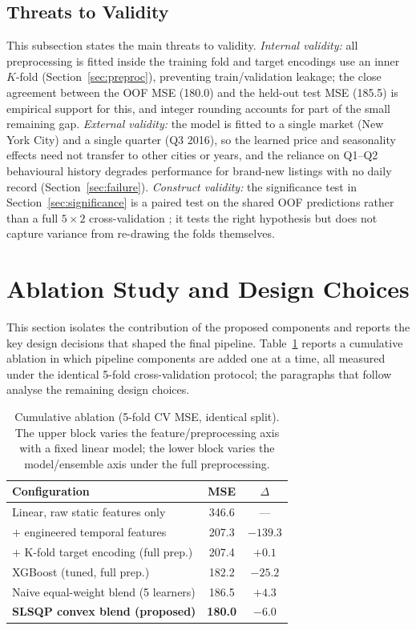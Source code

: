 \documentclass[journal]{IEEEtran}
\begin{document}
\subsection{Threats to Validity}
\label{sec:threats}
This subsection states the main threats to validity. \emph{Internal validity:}
all preprocessing is fitted inside the training fold and target encodings use an
inner $K$-fold (Section~\ref{sec:preproc}), preventing train/validation leakage;
the close agreement between the OOF MSE (180.0) and the held-out test MSE (185.5)
is empirical support for this, and integer rounding accounts for part of the
small remaining gap. \emph{External validity:} the model is fitted to a single
market (New York City) and a single quarter (Q3 2016), so the learned price and
seasonality effects need not transfer to other cities or years, and the reliance
on Q1--Q2 behavioural history degrades performance for brand-new listings with no
daily record (Section~\ref{sec:failure}). \emph{Construct validity:} the
significance test in Section~\ref{sec:significance} is a paired test on the
shared OOF predictions rather than a full $5\times2$ cross-validation
\cite{dietterich1998}; it tests the right hypothesis but does not capture
variance from re-drawing the folds themselves.

\section{Ablation Study and Design Choices}
\label{sec:changes}
This section isolates the contribution of the proposed components and reports the
key design decisions that shaped the final pipeline.
Table~\ref{tab:ablation} reports a cumulative ablation in which pipeline
components are added one at a time, all measured under the identical 5-fold
cross-validation protocol; the paragraphs that follow analyse the remaining
design choices.

\begin{table}[!t]
\caption{Cumulative ablation (5-fold CV MSE, identical split). The upper block
varies the feature/preprocessing axis with a fixed linear model; the lower block
varies the model/ensemble axis under the full preprocessing.}
\label{tab:ablation}
\centering
\begin{tabular}{lcc}
\toprule
Configuration & MSE & $\Delta$ \\
\midrule
Linear, raw static features only & 346.6 & --- \\
\quad $+$ engineered temporal features & 207.3 & $-139.3$ \\
\quad $+$ K-fold target encoding (full prep.) & 207.4 & $+0.1$ \\
\midrule
XGBoost (tuned, full prep.) & 182.2 & $-25.2$ \\
Naive equal-weight blend (5 learners) & 186.5 & $+4.3$ \\
\textbf{SLSQP convex blend (proposed)} & \textbf{180.0} & $-6.0$ \\
\bottomrule
\end{tabular}
\end{table}
\end{document}
